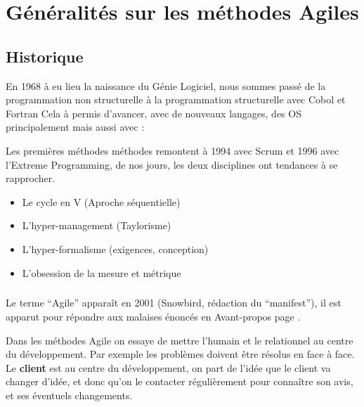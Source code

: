 \chapter{Généralités sur les méthodes Agiles}
	\nouveauChapitre
	\section{Historique}
		En 1968 à eu lieu la naissance du Génie Logiciel, nous sommes passé de la programmation non structurelle à la programmation structurelle avec Cobol et Fortran
		Cela à permis d'avancer, avec de nouveaux langages, des OS principalement mais aussi avec :

		Les premières méthodes méthodes remontent à 1994 avec Scrum et 1996 avec l'Extreme Programming, de nos jours, les deux disciplines ont tendances à se rapprocher.
		\begin{itemize}
			\item Le cycle en V (Aproche séquentielle)
			\item L'hyper-management (Taylorisme)
			\item L'hyper-formalisme (exigences, conception)
			\item L'obsession de la mesure et métrique
		\end{itemize}
		\paragraph{} Le terme ``Agile'' apparaît en 2001 (Snowbird, rédaction du ``manifest''), il est apparut pour répondre aux malaises énoncés en Avant-propos page \pageref{avantPropos}.


		Dans les méthodes Agile on essaye de mettre l'humain et le relationnel au centre du développement. Par exemple les problèmes doivent être résolus en face à face.
		Le \textbf{client} est au centre du développement, on part de l'idée que le client va changer d'idée, et donc qu'on le contacter régulièrement pour 
		connaître son avis, et ses éventuels changements.

